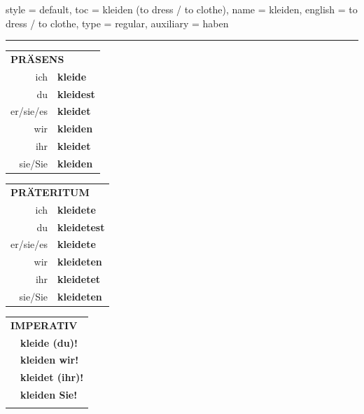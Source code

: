 \begin{verbentry}{
  style = {default},
  toc = {kleiden (to dress / to clothe)},
  name = {kleiden},
  english = {to dress / to clothe},
  type = {regular},
  auxiliary = {haben}
}
 
    
     \vspace{5pt}

    \hrule
    
    \vspace{5pt}

  \begin{tabular}{rl}
     \multicolumn{2}{l}{\textbf{PRÄSENS} }\\
    ich & \textbf{kleide}\\
    du & \textbf{kleidest}\\
    er/sie/es & \textbf{kleidet}\\
    wir & \textbf{kleiden}\\
    ihr & \textbf{kleidet}\\
    sie/Sie & \textbf{kleiden}\\
  \end{tabular}
  \hfill
     \begin{tabular}{rl}
    \multicolumn{2}{l}{\textbf{PRÄTERITUM} }\\
    ich & \textbf{kleidete}\\
    du & \textbf{kleidetest}\\
    er/sie/es & \textbf{kleidete}\\
    wir & \textbf{kleideten}\\
    ihr & \textbf{kleidetet}\\
    sie/Sie & \textbf{kleideten}\\
  \end{tabular}
  \hfill
  \begin{tabular}{rl}
     \multicolumn{2}{l}{\textbf{IMPERATIV} }\\
   & \textbf{kleide (du)!}\\
   & \textbf{kleiden wir!}\\
   & \textbf{kleidet (ihr)!}\\
   & \textbf{kleiden Sie!}\\
   & \vspace{10pt}
  \end{tabular}

    \vspace{10pt}


\end{verbentry}

